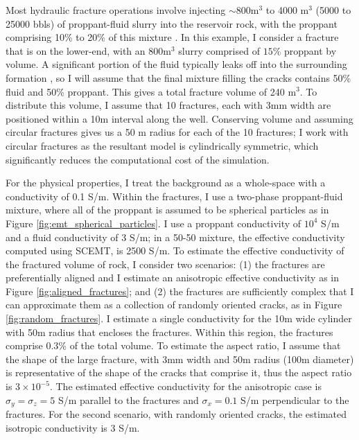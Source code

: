 Most hydraulic fracture operations involve injecting $\sim$800m$^3$ to 4000 m$^3$ (5000 to 25000 bbls) of proppant-fluid slurry into the reservoir rock, with the proppant comprising 10\% to 20\% of this mixture \citep{Hoversten2015}. In this example, I consider a fracture that is on the lower-end, with an 800m$^3$ slurry comprised of $15\%$ proppant by volume. A significant portion of the fluid typically leaks off into the surrounding formation \citep{Novotny1977}, so I will assume that the final mixture filling the cracks contains 50\% fluid and 50\% proppant. This gives a total fracture volume of 240 m$^3$. To distribute this volume, I assume that 10 fractures, each with 3mm width are positioned within a 10m interval along the well. Conserving volume and assuming circular fractures gives us a 50 m radius for each of the 10 fractures; I work with circular fractures as the resultant model is cylindrically symmetric, which significantly reduces the computational cost of the simulation.



For the physical properties, I treat the background as a whole-space with a conductivity of 0.1 S/m. Within the fractures, I use a two-phase proppant-fluid mixture, where all of the proppant is assumed to be spherical particles as in Figure \ref{fig:emt_spherical_particles}. I use a proppant conductivity of $10^4$ S/m and a fluid conductivity of 3 S/m; in a 50-50 mixture, the effective conductivity computed using SCEMT, is 2500 S/m. To estimate the effective conductivity of the fractured volume of rock, I consider two scenarios: (1) the fractures are preferentially aligned and I estimate an anisotropic effective conductivity as in Figure \ref{fig:aligned_fractures}; and (2) the fractures are sufficiently complex that I can approximate them as a collection of randomly oriented cracks, as in Figure \ref{fig:random_fractures}. I estimate a single conductivity for the 10m wide cylinder with 50m radius that encloses the fractures. Within this region, the fractures comprise 0.3\% of the total volume. To estimate the aspect ratio, I assume that the shape of the large fracture, with 3mm width and 50m radius (100m diameter) is representative of the shape of the cracks that comprise it, thus the aspect ratio is $3\times10^{-5}$. The estimated effective conductivity for the anisotropic case is $\sigma_y = \sigma_z = 5$ S/m parallel to the fractures and $\sigma_x = 0.1$ S/m perpendicular to the fractures. For the second scenario, with randomly oriented cracks, the estimated isotropic conductivity is 3 S/m.

